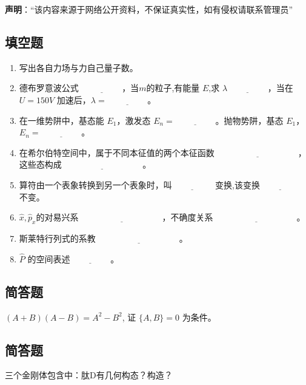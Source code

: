 
\textbf{声明}：“该内容来源于网络公开资料，不保证真实性，如有侵权请联系管理员”

\subsection{填空题}
\begin{enumerate}
    \item 写出各自力场与力自己量子数。
    \item 德布罗意波公式 $\underline{\hspace{2cm}}$，当$m$的粒子,有能量 $E$,求 $\lambda\underline{\hspace{2cm}}$，当在 $U = 150V$ 加速后，$\lambda = \underline{\hspace{2cm}}$。
    \item 在一维势阱中，基态能 $E_1$，激发态 $E_n = \underline{\hspace{2cm}}$。抛物势阱，基态 $E_1$，$E_n = \underline{\hspace{2cm}}$。
    \item 在希尔伯特空间中，属于不同本征值的两个本征函数 $\underline{\hspace{4cm}}$，这些态构成$\underline{\hspace{4cm}}$。
    \item 算符由一个表象转换到另一个表象时，叫$\underline{\hspace{2cm}}$ 变换,该变换$\underline{\hspace{2cm}}$ 不变。
    \item $\hat x,\hat p_x$的对易兴系 $\underline{\hspace{4cm}}$，不确度关系 $\underline{\hspace{4cm}}$。
    \item 斯莱特行列式的系教 $\underline{\hspace{4cm}}$。
    \item $\hat P$ 的空间表述$\underline{\hspace{2cm}}$。
\end{enumerate}
\subsection{简答题}
 $(A+B)(A-B) = A^2 - B^2$, 证 $\{A, B\} = 0$ 为条件。
\subsection{简答题}
三个金刚体包含中：肽D有几何构态？构造？
